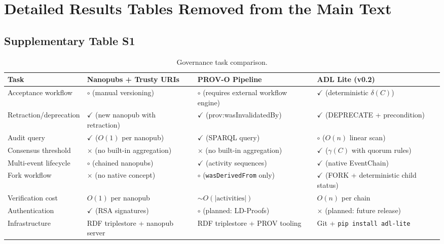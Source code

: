\section{Detailed Results Tables Removed from the Main Text}\label{app:tables-moved}

\subsection{Supplementary Table S1}\label{tab:S1}
\begin{table}[htbp]
\centering
\small
\caption{Governance task comparison.}
\label{tab:comparative-eval}
\begin{tabularx}{\textwidth}{@{}p{3.2cm}XXX@{}}
\toprule
\textbf{Task} & \textbf{Nanopubs + Trusty URIs} & \textbf{PROV-O Pipeline} & \textbf{ADL Lite (v0.2)} \\
\midrule
Acceptance workflow & $\circ$ (manual versioning) & $\circ$ (requires external workflow engine) & $\checkmark$ (deterministic $\delta(C)$) \\
Retraction/deprecation & $\checkmark$ (new nanopub with retraction) & $\checkmark$ (prov:wasInvalidatedBy) & $\checkmark$ (\textsc{DEPRECATE} + precondition) \\
Audit query & $\checkmark$ ($O(1)$ per nanopub) & $\checkmark$ (SPARQL query) & $\circ$ ($O(n)$ linear scan) \\
Consensus threshold & $\times$ (no built-in aggregation) & $\times$ (no built-in aggregation) & $\checkmark$ ($\gamma(C)$ with quorum rules) \\
Multi-event lifecycle & $\circ$ (chained nanopubs) & $\checkmark$ (activity sequences) & $\checkmark$ (native EventChain) \\
Fork workflow & $\times$ (no native concept) & $\circ$ (\texttt{wasDerivedFrom} only) & $\checkmark$ (\textsc{FORK} + deterministic child status) \\
Verification cost & $O(1)$ per nanopub & $\sim O(|\text{activities}|)$ & $O(n)$ per chain \\
Authentication & $\checkmark$ (RSA signatures) & $\circ$ (planned: LD-Proofs) & $\times$ (planned: future release) \\
Infrastructure & RDF triplestore + nanopub server & RDF triplestore + PROV tooling & Git + \texttt{pip install adl-lite} \\
\bottomrule
\end{tabularx}
\end{table}

